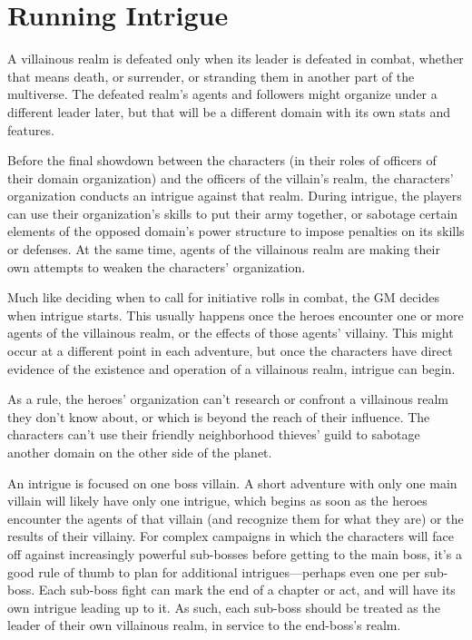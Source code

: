 \documentclass[10pt,a4paper,twoside,bg=print,twocolumn,openany,nodeprecatedcode]{dndbook}
\begin{document}
\section{Running Intrigue}
A villainous realm is defeated only when its leader is defeated in combat, whether that means death, or surrender, or stranding them in another part of the multiverse. The defeated realm's agents and followers might organize under a different leader later, but that will be a different domain with its own stats and features.

Before the final showdown between the characters (in their roles of officers of their domain organization) and the officers of the villain's realm, the characters' organization conducts an intrigue against that realm. During intrigue, the players can use their organization's skills to put their army together, or sabotage certain elements of the opposed domain's power structure to impose penalties on its skills or defenses. At the same time, agents of the villainous realm are making their own attempts to weaken the characters' organization.

Much like deciding when to call for initiative rolls in combat, the GM decides when intrigue starts. This usually happens once the heroes encounter one or more agents of the villainous realm, or the effects of those agents' villainy. This might occur at a different point in each adventure, but once the characters have direct evidence of the existence and operation of a villainous realm, intrigue can begin.

As a rule, the heroes' organization can't research or confront a villainous realm they don't know about, or which is beyond the reach of their influence. The characters can't use their friendly neighborhood thieves' guild to sabotage another domain on the other side of the planet.

An intrigue is focused on one boss villain. A short adventure with only one main villain will likely have only one intrigue, which begins as soon as the heroes encounter the agents of that villain (and recognize them for what they are) or the results of their villainy. For complex campaigns in which the characters will face off against increasingly powerful sub-bosses before getting to the main boss, it's a good rule of thumb to plan for additional intrigues—perhaps even one per sub-boss. Each sub-boss fight can mark the end of a chapter or act, and will have its own intrigue leading up to it. As such, each sub-boss should be treated as the leader of their own villainous realm, in service to the end-boss's realm.
\end{document}
